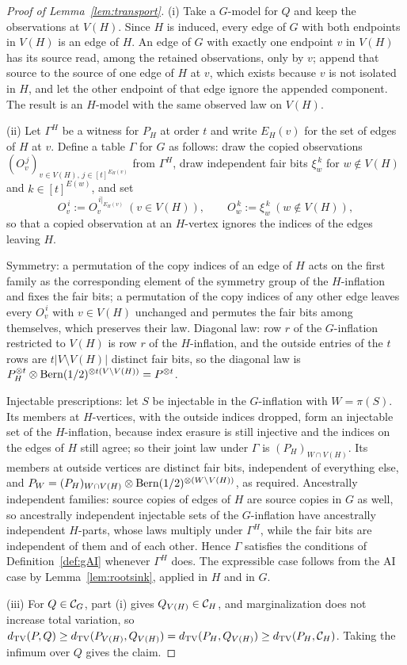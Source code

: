 \begin{proof}[Proof of Lemma~\ref{lem:transport}]
(i) Take a $G$-model for $Q$ and keep the observations at $V(H)$. Since $H$ is induced, every edge of $G$ with both endpoints in $V(H)$ is an edge of $H$. An edge of $G$ with exactly one endpoint $v$ in $V(H)$ has its source read, among the retained observations, only by $v$; append that source to the source of one edge of $H$ at $v$, which exists because $v$ is not isolated in $H$, and let the other endpoint of that edge ignore the appended component. The result is an $H$-model with the same observed law on $V(H)$.

(ii) Let $\Gamma^H$ be a witness for $P_H$ at order $t$ and write $E_H(v)$ for the set of edges of $H$ at $v$. Define a table $\Gamma$ for $G$ as follows: draw the copied observations $(O_v^{\,j})_{v\in V(H),\,j\in[t]^{E_H(v)}}$ from $\Gamma^H$, draw independent fair bits $\xi_w^{\,k}$ for $w\notin V(H)$ and $k\in[t]^{E(w)}$, and set
\[
O_v^{\,i}:=O_v^{\,i|_{E_H(v)}}\ (v\in V(H)),\qquad O_w^{\,k}:=\xi_w^{\,k}\ (w\notin V(H)),
\]
so that a copied observation at an $H$-vertex ignores the indices of the edges leaving $H$.

Symmetry: a permutation of the copy indices of an edge of $H$ acts on the first family as the corresponding element of the symmetry group of the $H$-inflation and fixes the fair bits; a permutation of the copy indices of any other edge leaves every $O_v^{\,i}$ with $v\in V(H)$ unchanged and permutes the fair bits among themselves, which preserves their law. Diagonal law: row $r$ of the $G$-inflation restricted to $V(H)$ is row $r$ of the $H$-inflation, and the outside entries of the $t$ rows are $t|V\setminus V(H)|$ distinct fair bits, so the diagonal law is $P_H^{\otimes t}\otimes\operatorname{Bern}(1/2)^{\otimes t(V\setminus V(H))}=P^{\otimes t}$.

Injectable prescriptions: let $S$ be injectable in the $G$-inflation with $W=\pi(S)$. Its members at $H$-vertices, with the outside indices dropped, form an injectable set of the $H$-inflation, because index erasure is still injective and the indices on the edges of $H$ still agree; so their joint law under $\Gamma$ is $(P_H)_{W\cap V(H)}$. Its members at outside vertices are distinct fair bits, independent of everything else, and $P_{W}=(P_H)_{W\cap V(H)}\otimes\operatorname{Bern}(1/2)^{\otimes(W\setminus V(H))}$, as required. Ancestrally independent families: source copies of edges of $H$ are source copies in $G$ as well, so ancestrally independent injectable sets of the $G$-inflation have ancestrally independent $H$-parts, whose laws multiply under $\Gamma^H$, while the fair bits are independent of them and of each other. Hence $\Gamma$ satisfies the conditions of Definition~\ref{def:gAI} whenever $\Gamma^H$ does. The expressible case follows from the AI case by Lemma~\ref{lem:rootsink}, applied in $H$ and in $G$.

(iii) For $Q\in\mathcal C_{G}$, part (i) gives $Q_{V(H)}\in\mathcal C_{H}$, and marginalization does not increase total variation, so $d_{\operatorname{TV}}(P,Q)\ge d_{\operatorname{TV}}(P_{V(H)},Q_{V(H)})=d_{\operatorname{TV}}(P_H,Q_{V(H)})\ge d_{\operatorname{TV}}(P_H,\mathcal C_{H})$. Taking the infimum over $Q$ gives the claim.
\end{proof}

